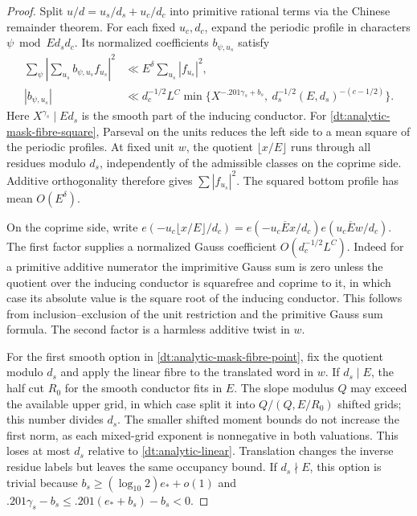 \documentclass[11pt,a4paper]{article}
\theoremstyle{paperplain}
\numberwithin{equation}{section}
\begin{document}
\begin{proof}
Split \(u/d=u_s/d_s+u_c/d_c\) into primitive rational terms via
the Chinese remainder theorem. For each fixed \(u_c,d_c\), expand
the periodic profile in characters \(\psi\bmod Ed_s d_c\). Its
normalized coefficients \(b_{\psi,u_s}\) satisfy
\begin{align}
 \sum_\psi\left|\sum_{u_s} b_{\psi,u_s}f_{u_s}\right|^2
     &\ll E^\delta\sum_{u_s}|f_{u_s}|^2, \label{dt:analytic-mask-fibre-square}\\
 |b_{\psi,u_s}|
     &\ll d_c^{-1/2}L^C
       \min\{X^{-.201\gamma_s+b_s},\
                    d_s^{-1/2}(E,d_s)^{-(c-1/2)}\} .
             \label{dt:analytic-mask-fibre-point}
\end{align}
Here \(X^{\gamma_s}\mid Ed_s\) is the smooth part of the inducing
conductor. For \eqref{dt:analytic-mask-fibre-square}, Parseval on
the units reduces the left side to a mean square of the periodic
profiles. At fixed unit \(w\), the quotient \(\lfloor x/E\rfloor\)
runs through all residues modulo \(d_s\), independently of the
admissible classes on the coprime side. Additive orthogonality
therefore gives \(\sum|f_{u_s}|^2\). The squared bottom profile
has mean \(O(E^\delta)\).

On the coprime side, write
\(e(-u_c\lfloor x/E\rfloor/d_c)=e(-u_c\overline E x/d_c)
 e(u_c\overline E w/d_c)\). The first factor supplies a normalized
Gauss coefficient \(O(d_c^{-1/2}L^C)\). Indeed for a primitive
additive numerator the imprimitive Gauss sum is zero unless the
quotient over the inducing conductor is squarefree and coprime
to it, in which case its absolute value is the square root of the
inducing conductor. This follows from inclusion--exclusion of the
unit restriction and the primitive Gauss sum formula. The second
factor is a harmless additive twist in \(w\).

For the first smooth option in \eqref{dt:analytic-mask-fibre-point},
fix the quotient modulo \(d_s\) and apply the linear fibre to the
translated word in \(w\). If \(d_s\mid E\), the half cut \(R_0\) for
the smooth conductor fits in \(E\). The slope modulus \(Q\) may
exceed the available upper grid, in which case split it into
\(Q/(Q,E/R_0)\) shifted grids; this number divides \(d_s\).
The smaller shifted moment bounds do not increase the first norm,
as each mixed-grid exponent is nonnegative in both valuations.
This loses at most \(d_s\) relative to
\eqref{dt:analytic-linear}. Translation changes the inverse residue
labels but leaves the same occupancy bound. If \(d_s\nmid E\), this
option is trivial because \(b_s\ge(\log_{10}2)e_*+o(1)\) and
\(.201\gamma_s-b_s\le .201(e_*+b_s)-b_s<0\).


\end{proof}
\end{document}
